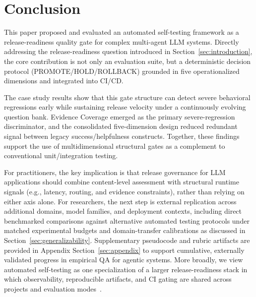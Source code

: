 \section{Conclusion}
\label{sec:conclusion}

This paper proposed and evaluated an automated self-testing framework as a release-readiness quality gate for complex multi-agent LLM systems. Directly addressing the release-readiness question introduced in Section~\ref{sec:introduction}, the core contribution is not only an evaluation suite, but a deterministic decision protocol (PROMOTE/HOLD/ROLLBACK) grounded in five operationalized dimensions and integrated into CI/CD.

The case study results show that this gate structure can detect severe behavioral regressions early while sustaining release velocity under a continuously evolving question bank. Evidence Coverage emerged as the primary severe-regression discriminator, and the consolidated five-dimension design reduced redundant signal between legacy success/helpfulness constructs. Together, these findings support the use of multidimensional structural gates as a complement to conventional unit/integration testing.

For practitioners, the key implication is that release governance for LLM applications should combine content-level assessment with structural runtime signals (e.g., latency, routing, and evidence constraints), rather than relying on either axis alone. For researchers, the next step is external replication across additional domains, model families, and deployment contexts, including direct benchmarked comparisons against alternative automated testing protocols under matched experimental budgets and domain-transfer calibrations as discussed in Section~\ref{sec:generalizability}. Supplementary pseudocode and rubric artifacts are provided in Appendix Section~\ref{sec:appendix} to support cumulative, externally validated progress in empirical QA for agentic systems.
More broadly, we view automated self-testing as one specialization of a larger release-readiness stack in which observability, reproducible artifacts, and CI gating are shared across projects and evaluation modes~\cite{maiorano2026readiness}.

